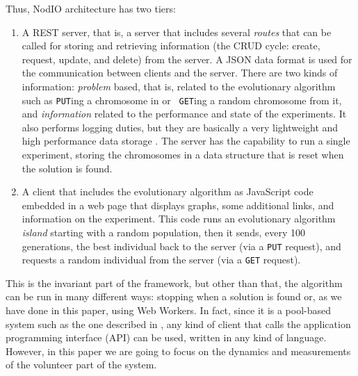 \documentclass[journal,onecolumn]{IEEEtran}
\begin{document}


Thus, {\sf NodIO} architecture has two tiers:\begin{enumerate}
\item A REST server, that is, a server that includes several {\em
  routes} 
  that can be called for storing and retrieving information (the CRUD cycle:
  create, request, update, and delete) from the server. 
  A JSON data format is used for the communication between 
  clients and the server. There are two kinds of information:
  {\em problem} based, that is, related to the
  evolutionary algorithm such as {\tt PUT}ing a chromosome in or {\tt
  GET}ing a random chromosome from it, and {\em information} related
  to the performance and state of the experiments. It also performs logging
  duties, but they are basically a very lightweight and high performance
  data storage \cite{jj:idc:lowcost}.
  The server has the capability to
  run a single experiment, storing the chromosomes in a data structure
  that is reset when the solution is found.
\item A client that includes the evolutionary algorithm as
  JavaScript code embedded in a web page that displays graphs, some
  additional links, and information on the experiment. This code runs
  an evolutionary algorithm {\em island} starting with a random
  population, then it sends, every 100 generations, the best individual
  back to the server (via a {\tt PUT} request), and requests a random
  individual from the server (via a {\tt GET} request). %
\end{enumerate}


  This is the invariant part of the framework, but other than that,
  the algorithm can be run in many different ways: 
  stopping when a solution is found or, as we have done in this paper,
  using Web Workers. In fact, since it is a pool-based system such as
  the one described in \cite{LNCS86720702}, any kind of client that
  calls the application programming interface (API) can be used, %
  written in any kind of language. However, in this paper we are going
  to focus on the dynamics and measurements of the volunteer part of
  the system. 
\end{document}

